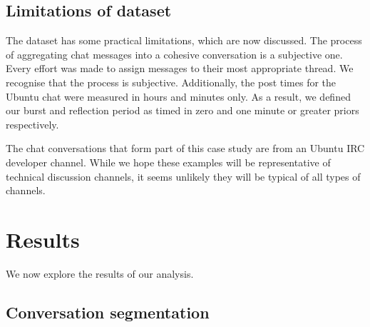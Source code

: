 \subsection{Limitations of dataset}

The dataset has some practical limitations, which are now discussed. The process of aggregating chat messages into a cohesive conversation is a subjective one. Every effort was made to assign messages to their most appropriate thread. We recognise that the process is subjective. Additionally, the post times for the Ubuntu chat were measured in hours and minutes only. As a result, we defined our burst and reflection period as timed in zero and one minute or greater priors respectively. 

The chat conversations that form part of this case study are from an Ubuntu IRC developer channel. While we hope these examples will be representative of technical discussion channels, it seems unlikely they will be typical of all types of channels.

\section{Results}

We now explore the results of our analysis.

\subsection{Conversation segmentation}


